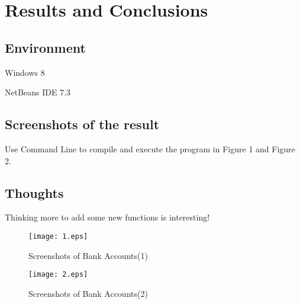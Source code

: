 \documentclass{article}
\begin{document}
\section{Results and Conclusions}
\subsection{Environment}
\begin{compactitem}
\item Windows 8
\item NetBeans IDE 7.3
\end{compactitem}
\subsection{Screenshots of the result}
Use Command Line to compile and execute the program in Figure 1 and Figure 2.

\subsection{Thoughts}
Thinking more to add some new functions is interesting!
\begin{figure}[h]
\centering
\texttt{[image: 1.eps]}
\caption{Screenshots of Bank Accounts(1)}
\end{figure}
\begin{figure}[h]
\centering
\texttt{[image: 2.eps]}
\caption{Screenshots of Bank Accounts(2)}
\end{figure}
\end{document}
